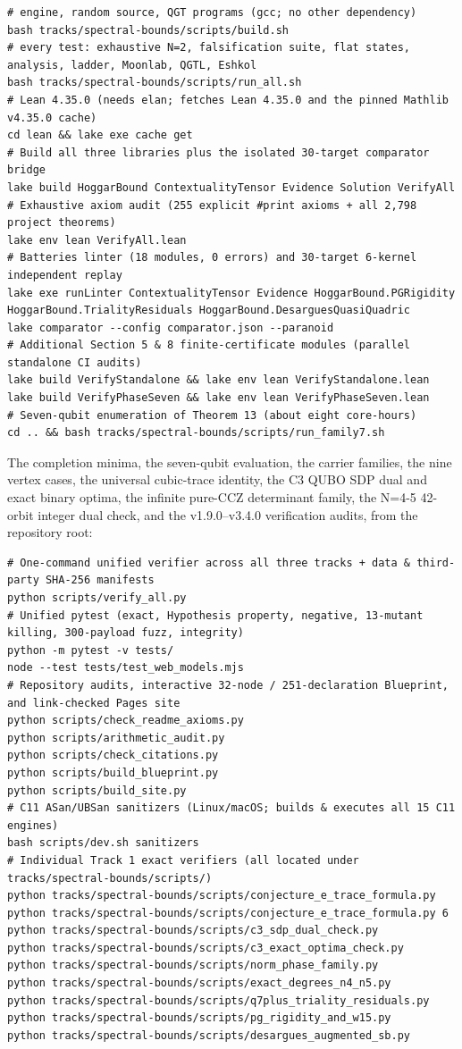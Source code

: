 \documentclass[11pt,a4paper]{article}
\begin{document}
\begin{verbatim}
# engine, random source, QGT programs (gcc; no other dependency)
bash tracks/spectral-bounds/scripts/build.sh
# every test: exhaustive N=2, falsification suite, flat states, analysis, ladder, Moonlab, QGTL, Eshkol
bash tracks/spectral-bounds/scripts/run_all.sh
# Lean 4.35.0 (needs elan; fetches Lean 4.35.0 and the pinned Mathlib v4.35.0 cache)
cd lean && lake exe cache get
# Build all three libraries plus the isolated 30-target comparator bridge
lake build HoggarBound ContextualityTensor Evidence Solution VerifyAll
# Exhaustive axiom audit (255 explicit #print axioms + all 2,798 project theorems)
lake env lean VerifyAll.lean
# Batteries linter (18 modules, 0 errors) and 30-target 6-kernel independent replay
lake exe runLinter ContextualityTensor Evidence HoggarBound.PGRigidity HoggarBound.TrialityResiduals HoggarBound.DesarguesQuasiQuadric
lake comparator --config comparator.json --paranoid
# Additional Section 5 & 8 finite-certificate modules (parallel standalone CI audits)
lake build VerifyStandalone && lake env lean VerifyStandalone.lean
lake build VerifyPhaseSeven && lake env lean VerifyPhaseSeven.lean
# Seven-qubit enumeration of Theorem 13 (about eight core-hours)
cd .. && bash tracks/spectral-bounds/scripts/run_family7.sh
\end{verbatim}

The completion minima, the seven-qubit evaluation, the carrier families, the nine vertex cases, the
universal cubic-trace identity, the C3 QUBO SDP dual and exact binary optima, the infinite pure-CCZ
determinant family, the N=4-5 42-orbit integer dual check, and the v1.9.0--v3.4.0 verification audits, from
the repository root:

\begin{verbatim}
# One-command unified verifier across all three tracks + data & third-party SHA-256 manifests
python scripts/verify_all.py
# Unified pytest (exact, Hypothesis property, negative, 13-mutant killing, 300-payload fuzz, integrity)
python -m pytest -v tests/
node --test tests/test_web_models.mjs
# Repository audits, interactive 32-node / 251-declaration Blueprint, and link-checked Pages site
python scripts/check_readme_axioms.py
python scripts/arithmetic_audit.py
python scripts/check_citations.py
python scripts/build_blueprint.py
python scripts/build_site.py
# C11 ASan/UBSan sanitizers (Linux/macOS; builds & executes all 15 C11 engines)
bash scripts/dev.sh sanitizers
# Individual Track 1 exact verifiers (all located under tracks/spectral-bounds/scripts/)
python tracks/spectral-bounds/scripts/conjecture_e_trace_formula.py
python tracks/spectral-bounds/scripts/conjecture_e_trace_formula.py 6
python tracks/spectral-bounds/scripts/c3_sdp_dual_check.py
python tracks/spectral-bounds/scripts/c3_exact_optima_check.py
python tracks/spectral-bounds/scripts/norm_phase_family.py
python tracks/spectral-bounds/scripts/exact_degrees_n4_n5.py
python tracks/spectral-bounds/scripts/q7plus_triality_residuals.py
python tracks/spectral-bounds/scripts/pg_rigidity_and_w15.py
python tracks/spectral-bounds/scripts/desargues_augmented_sb.py
\end{verbatim}
\end{document}
